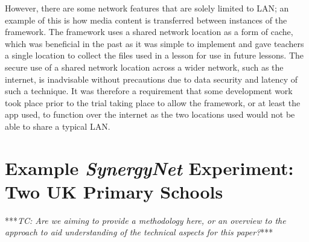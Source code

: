 \documentclass[twocolumn]{svjour3}          %
\begin{document}
However, there are some network features that are solely limited to LAN; an example of this is how media content is transferred between instances of the framework.
The framework uses a shared network location as a form of cache, which was beneficial in the past as it was simple to implement and gave teachers a single location to collect the files used in a lesson for use in future lessons.
The secure use of a shared network location across a wider network, such as the internet, is inadvisable without precautions due to data security and latency of such a technique.
It was therefore a requirement that some development work took place prior to the trial taking place to allow the framework, or at least the app used, to function over the internet as the two locations used would not be able to share a typical LAN.

\section{Example {\emph{SynergyNet}} Experiment: Two UK Primary Schools}

***{\emph{TC: Are we aiming to provide a methodology here, or an overview to the approach to aid understanding of the technical aspects for this paper?}}***
\end{document}
